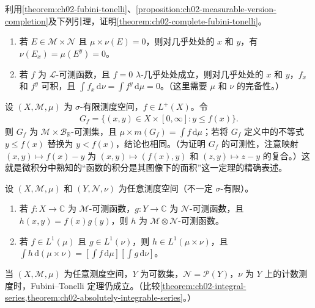 \documentclass[../../main.tex]{subfiles}%
\begin{document}
\begin{exercise}\label{exercise:ch02-complete-fubini-proof}
利用\cref{theorem:ch02-fubini-tonelli}、\cref{proposition:ch02-measurable-version-completion}及下列引理，证明\cref{theorem:ch02-complete-fubini-tonelli}。
\begin{enumerate}
\item\label{item:ch02-null-sections} 若 $E\in\mathscr{M}\times\mathscr{N}$ 且 $\mu\times\nu(E)=0$，则对几乎处处的 $x$ 和 $y$，有 $\nu(E_x)=\mu(E^y)=0$。
\item\label{item:ch02-null-function-sections} 若 $f$ 为 $\mathscr{L}$-可测函数，且 $f=0$ $\lambda$-几乎处处成立，则对几乎处处的 $x$ 和 $y$，$f_x$ 和 $f^y$ 可积，且 $\int f_x\,\mathrm{d}\nu=\int f^y\,\mathrm{d}\mu=0$。（这里需要 $\mu$ 和 $\nu$ 的完备性。）
\end{enumerate}
\end{exercise}
\begin{exercise}\label{exercise:ch02-area-under-graph}
设 $(X,\mathscr{M},\mu)$ 为 $\sigma$-有限测度空间，$f\in L^+(X)$。令
\begin{align*}
G_f=\{(x,y)\in X\times[0,\infty]:y\le f(x)\}.
\end{align*}
则 $G_f$ 为 $\mathscr{M}\times\mathscr{B}_{\mathbb{R}}$-可测集，且 $\mu\times m(G_f)=\int f\,\mathrm{d}\mu$；若将 $G_f$ 定义中的不等式 $y\le f(x)$ 替换为 $y<f(x)$，结论也相同。（为证明 $G_f$ 的可测性，注意映射 $(x,y)\mapsto f(x)-y$ 为 $(x,y)\mapsto(f(x),y)$ 和 $(z,y)\mapsto z-y$ 的复合。）这就是微积分中熟知的“函数的积分是其图像下的面积”这一定理的精确表述。
\end{exercise}
\begin{exercise}\label{exercise:ch02-product-functions}
设 $(X,\mathscr{M},\mu)$ 和 $(Y,\mathscr{N},\nu)$ 为任意测度空间（不一定 $\sigma$-有限）。
\begin{enumerate}
\item\label{item:ch02-product-function-measurable} 若 $f:X\to\mathbb{C}$ 为 $\mathscr{M}$-可测函数，$g:Y\to\mathbb{C}$ 为 $\mathscr{N}$-可测函数，且 $h(x,y)=f(x)g(y)$，则 $h$ 为 $\mathscr{M}\otimes\mathscr{N}$-可测函数。
\item\label{item:ch02-product-function-integral} 若 $f\in L^1(\mu)$ 且 $g\in L^1(\nu)$，则 $h\in L^1(\mu\times\nu)$，且 $\int h\,\mathrm{d}(\mu\times\nu)=[\int f\,\mathrm{d}\mu][\int g\,\mathrm{d}\nu]$。
\end{enumerate}
\end{exercise}
\begin{exercise}\label{exercise:ch02-fubini-countable-factor}
当 $(X,\mathscr{M},\mu)$ 为任意测度空间，$Y$ 为可数集，$\mathscr{N}=\mathscr{P}(Y)$，$\nu$ 为 $Y$ 上的计数测度时，Fubini--Tonelli 定理仍成立。（比较\cref{theorem:ch02-integral-series,theorem:ch02-absolutely-integrable-series}。）
\end{exercise}
\end{document}
